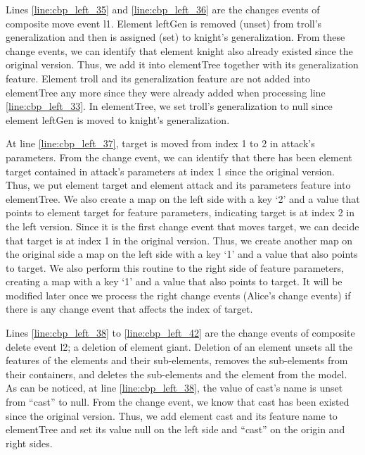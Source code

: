 Lines \ref{line:cbp_left_35} and \ref{line:cbp_left_36} are the changes events of  composite move event \textsf{l1}. Element \textsf{leftGen} is removed (unset) from \textsf{troll}'s \textsf{generalization} and then is assigned (set) to \textsf{knight}'s \textsf{generalization}. From these change events, we can identify that element \textsf{knight} also already existed since the original version. Thus, we add it into \textsf{elementTree} together with its  \textsf{generalization} feature. Element \textsf{troll} and its  \textsf{generalization} feature are not added into \textsf{elementTree} any more since they were already added when processing line \ref{line:cbp_left_33}. In \textsf{elementTree}, we set \textsf{troll}'s \textsf{generalization} to null since element \textsf{leftGen} is moved to \textsf{knight}'s \textsf{generalization}.

At line \ref{line:cbp_left_37}, \textsf{target} is moved from index 1 to 2 in \textsf{attack}'s \textsf{parameters}. From the change event, we can identify that there has been element \textsf{target} contained in \textsf{attack}'s \textsf{parameters} at index 1 since the original version. Thus, we put element \textsf{target} and element \textsf{attack} and its \textsf{parameters} feature into \textsf{elementTree}. We also create a map on the left side with a key `2' and a value that points to element \textsf{target} for feature \textsf{parameters}, indicating \textsf{target} is at index 2 in the left version. Since it is the first change event that moves \textsf{target}, we can decide that \textsf{target} is at index 1 in the original version. Thus, we create another map on the original side a map on the left side with a key `1' and a value that also points to \textsf{target}. We also perform this routine to the right side of feature \textsf{parameters}, creating a map with a key `1' and a value that also points to \textsf{target}. It will be modified later once we process the right change events (Alice's change events) if there is any change event that affects the index of \textsf{target}.

Lines \ref{line:cbp_left_38} to \ref{line:cbp_left_42} are the change events of  composite delete event \textsf{l2}; a deletion of element \textsf{giant}. 
Deletion of an element unsets all the features of the elements and their sub-elements, removes the sub-elements from their containers, and deletes the sub-elements and the element from the model. 
As can be noticed,  at line \ref{line:cbp_left_38}, the value of \textsf{cast}'s \textsf{name}  is unset from ``cast'' to null. From the change event, we know that cast has been existed since the original version. Thus, we add element \textsf{cast} and its feature \textsf{name} to \textsf{elementTree} and set its value null on the left side and ``cast'' on the origin and right sides. 

